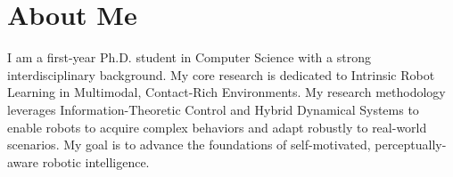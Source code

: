 \section{About Me}
\justifying
I am a first-year Ph.D. student in Computer Science with a strong interdisciplinary background. My core research is dedicated to Intrinsic Robot Learning in Multimodal, Contact-Rich Environments. My research methodology leverages Information-Theoretic Control and Hybrid Dynamical Systems to enable robots to acquire complex behaviors and adapt robustly to real-world scenarios. My goal is to advance the foundations of self-motivated, perceptually-aware robotic intelligence.